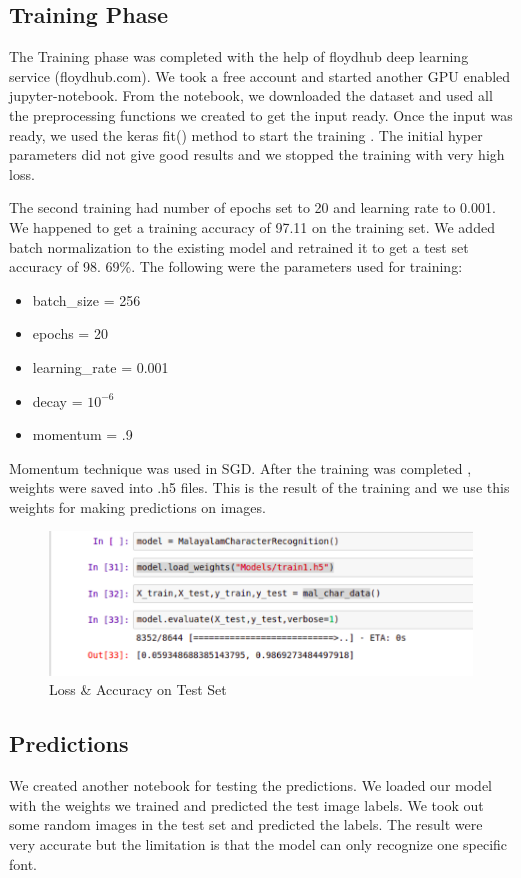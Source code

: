 \documentclass[12pt]{report}
\begin{document}
\newpage
\subsection*{Training Phase}
The Training phase was completed with the help of floydhub deep learning service (floydhub.com). We took a free account and started another GPU enabled jupyter-notebook. From the notebook, we downloaded the dataset and used all the preprocessing functions we created to get the input ready. Once the input was ready, we used the keras fit() method to start the training . The initial hyper parameters did not give good results and we stopped the training with very high loss.

The second training had number of epochs set to 20 and learning rate to 0.001. We happened to get a training accuracy of 97.11 on the training set. We added batch normalization to the existing model and retrained it to get a test set accuracy of 98. 69\%. 
The following were the parameters used for training: 

\begin{itemize}

\item batch\_size = 256
\item epochs = 20
\item learning\_rate = 0.001
\item decay = $ 10^{-6} $
\item momentum = .9

\end{itemize}

Momentum technique was used in SGD. After the training was completed , weights were saved into .h5 files. This is the result of the training and we use this weights for making predictions on images. 

\begin{figure}[h]
    \centering
    \includegraphics[width=\textwidth]{result.png}
    \caption{Loss \& Accuracy on Test Set}
\end{figure}

\clearpage
\subsection*{Predictions}
We created another notebook for testing the predictions. We loaded our model with the weights we trained and predicted the test image labels. We took out some random images in the test set and predicted the labels. The result were very accurate but the limitation is that the model can only recognize one specific font.
\end{document}
